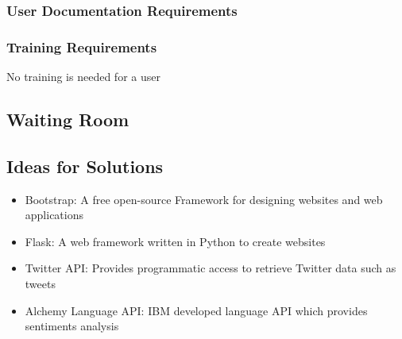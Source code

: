 \documentclass[12pt]{article}
\begin{document}
\subsubsection{User Documentation Requirements}

\subsubsection{Training Requirements}
No training is needed for a user

\subsection{Waiting Room} 


\subsection{Ideas for Solutions} 
\begin{itemize}
\item Bootstrap: A free open-source Framework for designing websites and web applications
\item Flask: A web framework written in Python to create websites
\item Twitter API: Provides programmatic access to retrieve Twitter data such as tweets
\item Alchemy Language API: IBM developed language API which provides sentiments analysis
\end{itemize}
\end{document}
